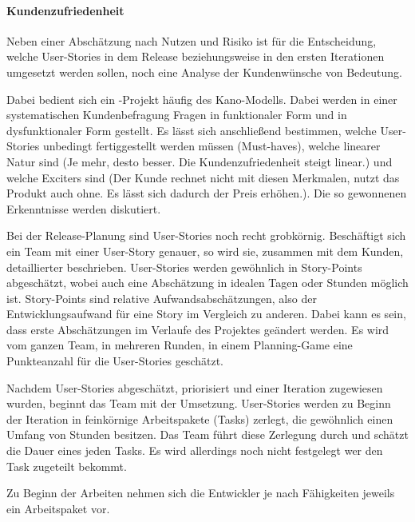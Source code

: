 \documentclass[fontsize=9pt,paper=a4,parskip=half,DIV=11,twocolumn]{scrartcl}
\begin{document}
\paragraph{Kundenzufriedenheit}

Neben einer Abschätzung nach Nutzen und Risiko ist für die Entscheidung, welche
User-Stories in dem Release beziehungsweise in den ersten Iterationen umgesetzt
werden sollen, noch eine Analyse der Kundenwünsche von Bedeutung. 

Dabei bedient
sich ein \ADCD{}-Projekt häufig des Kano-Modells. Dabei werden in einer
systematischen Kundenbefragung Fragen in funktionaler Form und in dysfunktionaler Form gestellt.
Es lässt sich anschließend bestimmen, welche User-Stories unbedingt
fertiggestellt werden müssen (Must-haves), welche linearer Natur sind (Je mehr,
desto besser. Die Kundenzufriedenheit steigt linear.) und welche Exciters sind
(Der Kunde rechnet nicht mit diesen Merkmalen, nutzt das Produkt auch ohne. Es
lässt sich dadurch der Preis erhöhen.). Die so gewonnenen Erkenntnisse werden
diskutiert.


Bei der Release-Planung sind User-Stories noch recht grobkörnig. Beschäftigt sich
ein Team mit einer User-Story genauer, so wird sie, zusammen mit dem Kunden,
detaillierter beschrieben. User-Stories werden gewöhnlich in Story-Points
abgeschätzt, wobei auch eine Abschätzung in idealen Tagen oder Stunden möglich
ist. Story-Points sind relative Aufwandsabschätzungen, also der Entwicklungsaufwand
für eine Story im Vergleich zu anderen. Dabei kann es sein, dass erste
Abschätzungen im Verlaufe des Projektes geändert werden. Es wird vom ganzen Team,
in mehreren Runden, in einem Planning-Game eine Punkteanzahl für die User-Stories
geschätzt.

Nachdem User-Stories abgeschätzt, priorisiert und einer Iteration zugewiesen
wurden, beginnt das Team mit der Umsetzung. User-Stories werden zu Beginn der
Iteration in feinkörnige Arbeitspakete (Tasks) zerlegt, die
gewöhnlich einen Umfang von Stunden besitzen. Das Team führt diese Zerlegung
durch und schätzt die Dauer eines jeden Tasks. Es wird allerdings noch nicht
festgelegt wer den Task zugeteilt bekommt. 

Zu Beginn der Arbeiten nehmen sich die
Entwickler je nach Fähigkeiten jeweils ein Arbeitspaket vor.  
\end{document}
